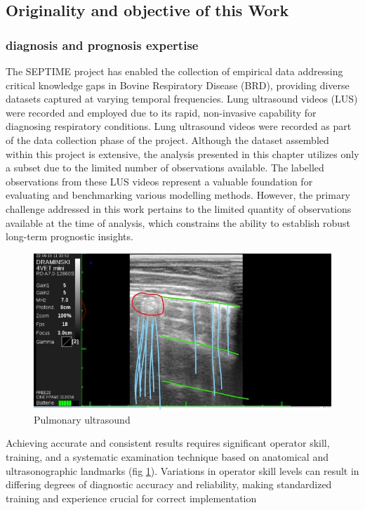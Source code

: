 \subsection{Originality and objective of this Work}

\subsubsection*{diagnosis and prognosis expertise}

The SEPTIME project has enabled the collection of empirical data addressing critical knowledge gaps in Bovine Respiratory Disease (BRD), providing diverse datasets captured at varying temporal frequencies. Lung ultrasound videos (LUS) were recorded and employed due to its rapid, non-invasive capability for diagnosing respiratory conditions. Lung ultrasound videos were recorded as part of the data collection phase of the project. Although the dataset assembled within this project is extensive, the analysis presented in this chapter utilizes only a subset due to the limited number of observations available. The labelled observations from these LUS videos represent a valuable foundation for evaluating and benchmarking various modelling methods. However, the primary challenge addressed in this work pertains to the limited quantity of observations available at the time of analysis, which constrains the ability to establish robust long-term prognostic insights.

\begin{figure}
  \includegraphics[width=\linewidth]{figures/chap2/annotated_ultrasound.jpg}
  \caption{Pulmonary ultrasound}
  \label{fig:ultrasound}
\end{figure}
\newpage

Achieving accurate and consistent results requires significant operator skill, training, and a systematic examination technique based on anatomical and ultrasonographic landmarks (fig \ref{fig:ultrasound}). Variations in operator skill levels can result in differing degrees of diagnostic accuracy and reliability, making standardized training and experience crucial for correct implementation


